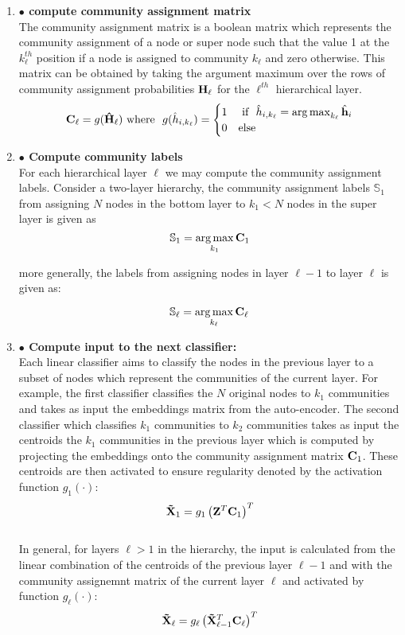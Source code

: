\documentclass[a4paper,12pt]{article}
\DeclareMathOperator*{\argmax}{arg\,max}
\begin{document}
\begin{itemize}
\begin{enumerate}
{\begin{enumerate}
				
				\item[]{\textbf{$\bullet$ compute community assignment matrix} \\ 
					The community assignment matrix is a boolean matrix which represents the community assignment of a node or super node such that the value 1 at the $k_\ell^{th}$ position if a node is assigned to community $k_\ell$ and zero otherwise. This matrix can be obtained by taking the argument maximum over the rows of community assignment probabilities ${\bf H}_\ell$ for the $\ell^{th}$ hierarchical layer.  
					\[{\bf C}_{\ell} = g({\bf \hat{H}}_{\ell}) \ \text{where} \ \  g(\hat{h}_{i,k_\ell}) = 
					\begin{cases} 1 & \ \text{if} \ \ \hat{h}_{i,k_\ell} = \argmax_{k_\ell} \hat{\bf h}_i \\ %
						0 & \text{else} %
					\end{cases}\]}
				
				\item[]{\textbf{$\bullet$ Compute community labels} \\
					For each hierarchical layer $\ell$ we may compute the community assignment labels. Consider a two-layer hierarchy, the community assignment labels $\mathbb{S}_1$ from assigning $N$ nodes in the bottom layer to $k_1 < N$ nodes in the super layer is given as 
					\[\mathbb{S}_1 = \argmax_{k_1} {\bf C}_1 \]
					
					more generally, the labels from assigning nodes in layer $\ell - 1$ to layer $\ell$ is given as:
					
					\[ \mathbb{S}_\ell = \argmax_{k_\ell} {\bf C}_{\ell}\]}
				
				\item[]{\textbf{$\bullet$ Compute input to the next classifier:}  \\
					Each linear classifier aims to classify the nodes in the previous layer to a subset of nodes which represent the communities of the current layer. For example, the first classifier classifies the $N$ original nodes to $k_1$ communities and takes as input the embeddings matrix from the auto-encoder. The second classifier which classifies $k_1$ communities to $k_2$ communities takes as input the centroids the $k_1$ communities in the previous layer which is computed by projecting the embeddings onto the community assignment matrix ${\bf C}_1$. These centroids are then activated to ensure regularity denoted by the activation function $g_1(\cdot)$:
					\[ {\bf \tilde X}_{1} = g_1\left({\bf Z}^T {\bf C}_{1}\right)^T\] 
					\\
					In general, for layers $\ell > 1$ in the hierarchy, the input is calculated from the linear combination of the centroids of the previous layer $\ell - 1$ and with the community assignemnt matrix of the current layer $\ell$ and activated by function $g_\ell(\cdot)$: 
					\[ {\bf \tilde X}_{\ell} = g_\ell\left({\bf \tilde{X}}_{\ell-1}^T {\bf C}_{\ell}\right)^T\] 
					\\
					
}
\end{enumerate}}
\end{enumerate}
\end{itemize}
\end{document}
